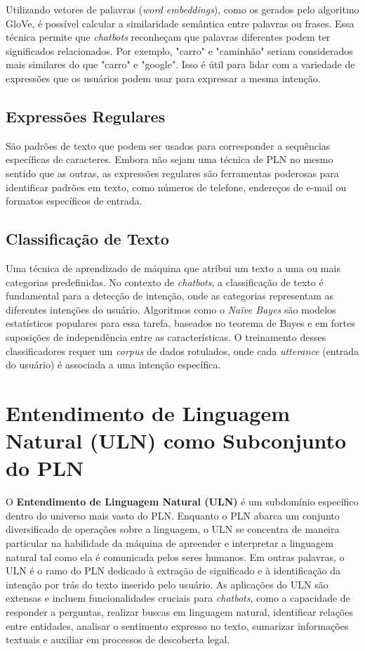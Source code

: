 \documentclass[14pt,a4paper,oneside]{book}
\begin{document}
Utilizando vetores de palavras (\textit{word embeddings}), como os gerados pelo algoritmo GloVe, é possível calcular a similaridade semântica entre palavras ou frases. Essa técnica permite que \textit{chatbots} reconheçam que palavras diferentes podem ter significados relacionados. Por exemplo, "carro" e "caminhão" seriam considerados mais similares do que "carro" e "google". Isso é útil para lidar com a variedade de expressões que os usuários podem usar para expressar a mesma intenção.

\subsection{Expressões Regulares}

São padrões de texto que podem ser usados para corresponder a sequências específicas de caracteres. Embora não sejam uma técnica de PLN no mesmo sentido que as outras, as expressões regulares são ferramentas poderosas para identificar padrões em texto, como números de telefone, endereços de e-mail ou formatos específicos de entrada.

\subsection{Classificação de Texto}

Uma técnica de aprendizado de máquina que atribui um texto a uma ou mais categorias predefinidas. No contexto de \textit{chatbots}, a classificação de texto é fundamental para a detecção de intenção, onde as categorias representam as diferentes intenções do usuário. Algoritmos como o \textit{Naïve Bayes} são modelos estatísticos populares para essa tarefa, baseados no teorema de Bayes e em fortes suposições de independência entre as características. O treinamento desses classificadores requer um \textit{corpus} de dados rotulados, onde cada \textit{utterance} (entrada do usuário) é associada a uma intenção específica.


\section{Entendimento de Linguagem Natural (ULN) como Subconjunto do PLN}

O \textbf{Entendimento de Linguagem Natural (ULN)} é um subdomínio específico dentro do universo mais vasto do PLN. Enquanto o PLN abarca um conjunto diversificado de operações sobre a linguagem, o ULN se concentra de maneira particular na habilidade da máquina de apreender e interpretar a linguagem natural tal como ela é comunicada pelos seres humanos. 
Em outras palavras, o ULN é o ramo do PLN dedicado à extração de significado e à identificação da intenção por trás do texto inserido pelo usuário. As aplicações do ULN são extensas e incluem funcionalidades cruciais para \textit{chatbots}, como a capacidade de responder a perguntas, realizar buscas em linguagem natural, identificar relações entre entidades, analisar o sentimento expresso no texto, sumarizar informações textuais e auxiliar em processos de descoberta legal.
\end{document}
